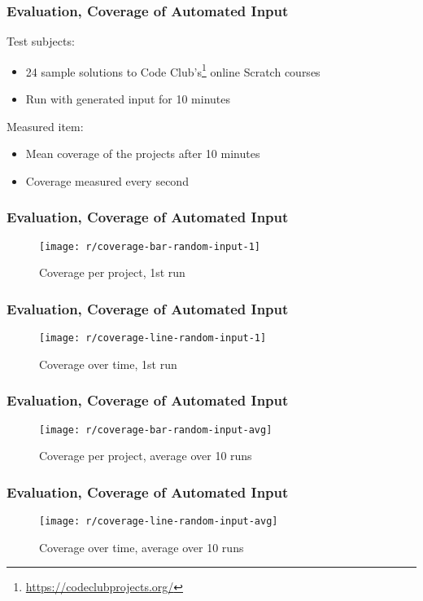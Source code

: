 \begin{frame}\frametitle{Evaluation, Coverage of Automated Input}
    Test subjects:
    \begin{itemize}
        \item 24 sample solutions to Code Club's\footnote{\url{https://codeclubprojects.org/}} online Scratch courses
        \item Run with generated input for 10 minutes
    \end{itemize}

    \pause
    \bigskip

    Measured item:
    \begin{itemize}
        \item Mean coverage of the projects after 10 minutes
        \item Coverage measured every second
    \end{itemize}
\end{frame}

\begin{frame}\frametitle{Evaluation, Coverage of Automated Input}
    \begin{figure}
        \texttt{[image: r/coverage-bar-random-input-1]}
        \caption{Coverage per project, 1st run}
    \end{figure}
\end{frame}

\begin{frame}\frametitle{Evaluation, Coverage of Automated Input}
    \begin{figure}
        \texttt{[image: r/coverage-line-random-input-1]}
        \caption{Coverage over time, 1st run}
    \end{figure}
\end{frame}

\begin{frame}\frametitle{Evaluation, Coverage of Automated Input}
    \begin{figure}
        \texttt{[image: r/coverage-bar-random-input-avg]}
        \caption{Coverage per project, average over 10 runs}
    \end{figure}
\end{frame}

\begin{frame}\frametitle{Evaluation, Coverage of Automated Input}
    \begin{figure}
        \texttt{[image: r/coverage-line-random-input-avg]}
        \caption{Coverage over time, average over 10 runs}
    \end{figure}
\end{frame}

